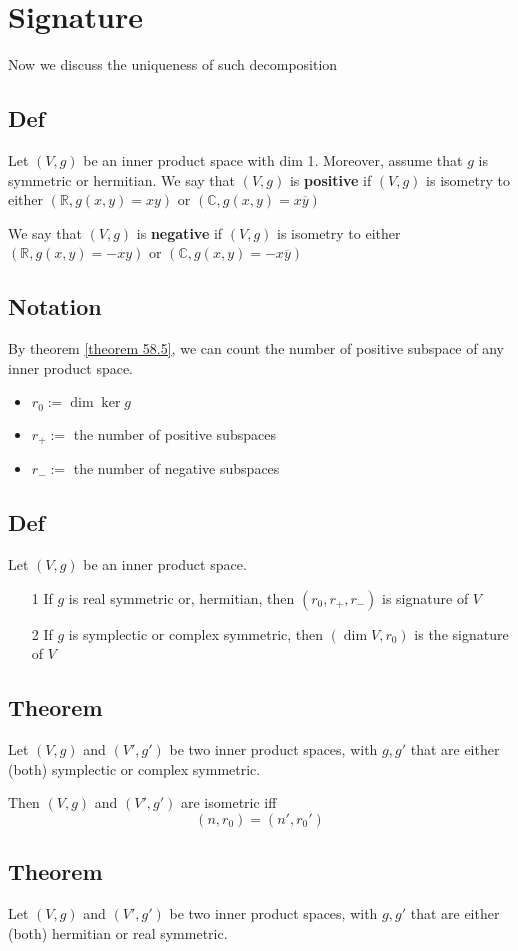 \documentclass{book}
\begin{document}
\chapter{Signature}
Now we discuss the uniqueness of such decomposition
\section{Def}
Let $(V,g)$ be an inner product space with dim 1. Moreover, assume that $g$ is symmetric or hermitian. We say that $(V,g)$ is \textbf{positive} if $(V,g)$ is isometry to either $(\mathbb{R},g(x,y)=xy)$ or $(\mathbb{C},g(x,y)=x\overline{y})$

We say that $(V,g)$ is \textbf{negative} if $(V,g)$ is isometry to either $(\mathbb{R},g(x,y)=-xy)$ or $(\mathbb{C},g(x,y)=-x\overline{y})$
\section{Notation}
By theorem \ref{theorem 58.5}, we can count the number of positive subspace of any inner product space.
\begin{itemize}
    \item $r_0:=\dim\ker g$
    \item $r_+:=$ the number of positive subspaces
    \item $r_-:=$ the number of negative subspaces
\end{itemize}
\section{Def}
Let $(V,g)$ be an inner product space.
\begin{itemize}
    \item [1]If $g$ is real symmetric or, hermitian, then $(r_0,r_+,r_-)$ is signature of $V$
    \item [2]If $g$ is symplectic or complex symmetric, then $(\dim V,r_0)$ is the signature of $V$
\end{itemize}
\section{Theorem}
Let $(V,g)$ and $(V',g')$ be two inner product spaces, with $g,g'$ that are either (both) symplectic or complex symmetric.

Then $(V,g)$ and $(V',g')$ are isometric iff$$(n,r_0)=(n',r_0')$$

\section{Theorem}
Let $(V,g)$ and $(V',g')$ be two inner product spaces, with $g,g'$ that are either (both) hermitian or real symmetric.
\end{document}
